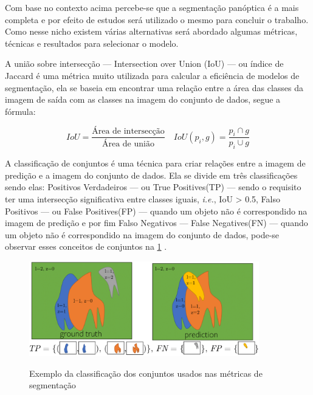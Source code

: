 Com base no contexto acima percebe-se que a segmentação panóptica é a mais completa e por efeito de estudos será utilizado o mesmo para concluir o trabalho. Como nesse nicho existem várias alternativas será abordado algumas métricas, técnicas e resultados para selecionar o modelo.


A união sobre intersecção — Intersection over Union (IoU) — ou índice de Jaccard é uma métrica muito utilizada para calcular a eficiência de modelos de segmentação, ela se baseia em encontrar uma relação entre a área das classes da imagem de saída com as classes na imagem do conjunto de dados, segue a fórmula\cite{dp_semantic_segmantation, lapix, kirillov2019panoptic}:

\begin{equation}	
	IoU = \frac{\text{Área de intersecção}}{\text{Área de união}} \quad IoU(p_i, g) = \frac{p_i \cap g}{ p_i \cup g}
\end{equation}



A classificação de conjuntos é uma técnica para criar relações entre a imagem de predição e a imagem do conjunto de dados. Ela se divide em três classificações sendo elas: Positivos Verdadeiros — ou True Positives(TP) — sendo o requisito ter uma intersecção significativa entre classes iguais, \emph{i.e.}, IoU > 0.5, Falso Positivos — ou False Positives(FP) — quando um objeto não é correspondido na imagem de predição e por fim Falso Negativos — False Negatives(FN) — quando um objeto não é correspondido na imagem do conjunto de dados, pode-se observar esses conceitos de conjuntos na \cref{fig:conjuntos} \cite{kirillov2019panoptic}.
\begin{figure}[H]
	\caption{Exemplo da classificação dos conjuntos usados nas métricas de segmentação}
	\centering %
	\includegraphics[width=10cm]{figures/pan_metric.png} %
	\label{fig:conjuntos}
\end{figure}

